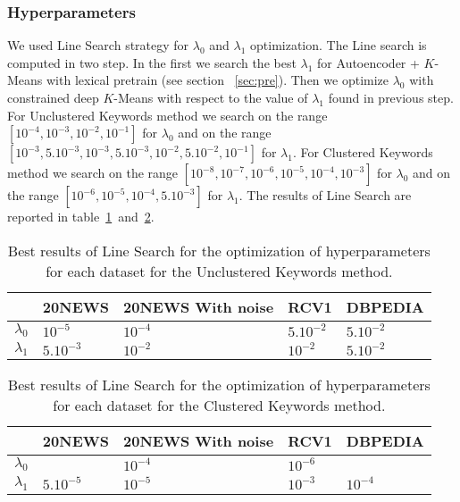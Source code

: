 \subsubsection{Hyperparameters}
We used Line Search strategy for 
$\lambda_0$ and $\lambda_1$ optimization. The Line search is computed in two step.
In the first we search the best $\lambda_1$ for Autoencoder + $K$-Means with lexical
pretrain (see section ~\ref{sec:pre}). Then we optimize $\lambda_0$ with constrained 
deep $K$-Means with respect to the value of $\lambda_1$ found in previous step.
\\ For Unclustered Keywords method we search on the range 
$[10^{-4},10^{-3},10^{-2},10^{-1}]$ for $\lambda_0$ and on the range
\\$[10^{-3},5.10^{-3},10^{-3},5.10^{-3},10^{-2},5.10^{-2},10^{-1}]$ 
for $\lambda_1$.   
For Clustered Keywords method we search on the range 
$[10^{-8},10^{-7},10^{-6},10^{-5},10^{-4},10^{-3}]$ for $\lambda_0$ and on the range
$[10^{-6},10^{-5},10^{-4},5.10^{-3}]$ 
for $\lambda_1$.
The results of Line Search are reported in table~\ref{tab:line_search_met1}~and~\ref{tab:line_search_met2}.
\begin{table}[!h]
\centering
  \begin{tabular}{| l | l | l | l | l |}
    \hline
     & 20NEWS  & 20NEWS With noise & RCV1 & DBPEDIA  
\\ \hline
    $\lambda_0$  & $10^{-5}$            & $10^{-4}$      & $5.10^{-2}$ & $5.10^{-2}$           
\\ \hline
    $\lambda_1$ & $5.10^{-3}$          & $10^{-2}$       & $10^{-2}$ & $5.10^{-2}$          
\\ \hline
  \end{tabular}
  \caption{\label{tab:line_search_met1}Best results of Line Search for the optimization of
hyperparameters for each dataset for the Unclustered Keywords method.}
\end{table}
\begin{table}[!h]
\centering
  \begin{tabular}{| l | l | l | l | l |}
    \hline
     & 20NEWS  & 20NEWS With noise & RCV1 & DBPEDIA  
\\ \hline
    $\lambda_0$  & &$10^{-4}$         & $10^{-6}$ &           
\\ \hline
    $\lambda_1$ & $5.10^{-5}$          & $10^{-5}$       & $10^{-3}$ & $10^{-4}$          
\\ \hline
  \end{tabular}
  \caption{\label{tab:line_search_met2}Best results of Line Search for the optimization of
hyperparameters for each dataset for the Clustered Keywords method.}
\end{table}

